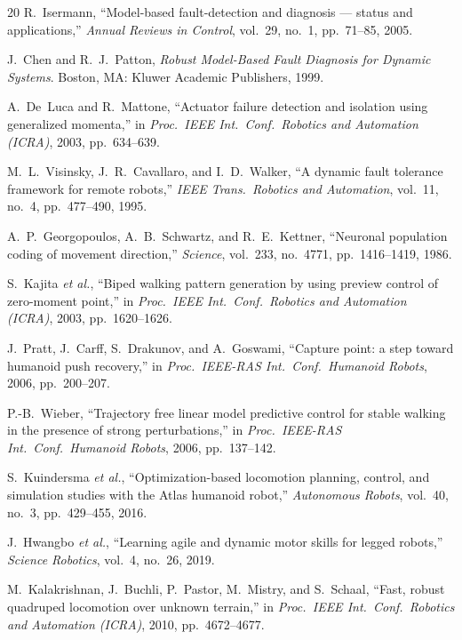 \begin{thebibliography}{20}
R.~Isermann, ``Model-based fault-detection and diagnosis --- status and
applications,'' \emph{Annual Reviews in Control}, vol.~29, no.~1, pp.~71--85,
2005.

J.~Chen and R.~J.~Patton, \emph{Robust Model-Based Fault Diagnosis for Dynamic
Systems}. Boston, MA: Kluwer Academic Publishers, 1999.

A.~De~Luca and R.~Mattone, ``Actuator failure detection and isolation using
generalized momenta,'' in \emph{Proc.\ IEEE Int.\ Conf.\ Robotics and
Automation (ICRA)}, 2003, pp.~634--639.

M.~L.~Visinsky, J.~R.~Cavallaro, and I.~D.~Walker, ``A dynamic fault tolerance
framework for remote robots,'' \emph{IEEE Trans.\ Robotics and Automation},
vol.~11, no.~4, pp.~477--490, 1995.

A.~P.~Georgopoulos, A.~B.~Schwartz, and R.~E.~Kettner, ``Neuronal population
coding of movement direction,'' \emph{Science}, vol.~233, no.~4771,
pp.~1416--1419, 1986.

S.~Kajita \emph{et al.}, ``Biped walking pattern generation by using preview
control of zero-moment point,'' in \emph{Proc.\ IEEE Int.\ Conf.\ Robotics and
Automation (ICRA)}, 2003, pp.~1620--1626.

J.~Pratt, J.~Carff, S.~Drakunov, and A.~Goswami, ``Capture point: a step toward
humanoid push recovery,'' in \emph{Proc.\ IEEE-RAS Int.\ Conf.\ Humanoid
Robots}, 2006, pp.~200--207.

P.-B.~Wieber, ``Trajectory free linear model predictive control for stable
walking in the presence of strong perturbations,'' in \emph{Proc.\ IEEE-RAS
Int.\ Conf.\ Humanoid Robots}, 2006, pp.~137--142.

S.~Kuindersma \emph{et al.}, ``Optimization-based locomotion planning, control,
and simulation studies with the Atlas humanoid robot,'' \emph{Autonomous
Robots}, vol.~40, no.~3, pp.~429--455, 2016.

J.~Hwangbo \emph{et al.}, ``Learning agile and dynamic motor skills for legged
robots,'' \emph{Science Robotics}, vol.~4, no.~26, 2019.

M.~Kalakrishnan, J.~Buchli, P.~Pastor, M.~Mistry, and S.~Schaal, ``Fast,
robust quadruped locomotion over unknown terrain,'' in \emph{Proc.\ IEEE Int.\
Conf.\ Robotics and Automation (ICRA)}, 2010, pp.~4672--4677.


\end{thebibliography}
